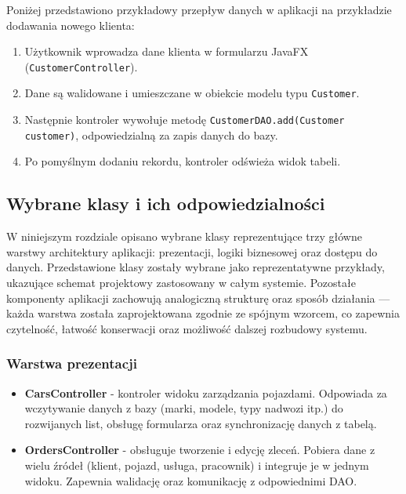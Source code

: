 Poniżej przedstawiono przykładowy przepływ danych w aplikacji na przykładzie dodawania nowego klienta:

\begin{enumerate}
    \item Użytkownik wprowadza dane klienta w formularzu JavaFX (\texttt{CustomerController}).
    \item Dane są walidowane i umieszczane w obiekcie modelu typu \texttt{Customer}.
    \item Następnie kontroler wywołuje metodę \texttt{CustomerDAO.add(Customer customer)}, odpowiedzialną za zapis danych do bazy.
    \item Po pomyślnym dodaniu rekordu, kontroler odświeża widok tabeli.
\end{enumerate}

\subsection{Wybrane klasy i ich odpowiedzialności}
\label{sec:klasyIOdpowiedzialnosci}

W niniejszym rozdziale opisano wybrane klasy reprezentujące trzy główne warstwy architektury aplikacji: prezentacji, logiki biznesowej oraz dostępu do danych. Przedstawione klasy zostały wybrane jako reprezentatywne przykłady, ukazujące schemat projektowy zastosowany w całym systemie. Pozostałe komponenty aplikacji zachowują analogiczną strukturę oraz sposób działania — każda warstwa została zaprojektowana zgodnie ze spójnym wzorcem, co zapewnia czytelność, łatwość konserwacji oraz możliwość dalszej rozbudowy systemu.
\subsubsection*{Warstwa prezentacji}
\begin{itemize}
    \item \textbf{CarsController} - kontroler widoku zarządzania pojazdami. Odpowiada za wczytywanie danych z bazy (marki, modele, typy nadwozi itp.) do rozwijanych list, obsługę formularza oraz synchronizację danych z tabelą.
    
    \item \textbf{OrdersController} - obsługuje tworzenie i edycję zleceń. Pobiera dane z wielu źródeł (klient, pojazd, usługa, pracownik) i integruje je w jednym widoku. Zapewnia walidację oraz komunikację z odpowiednimi DAO.
\end{itemize}

